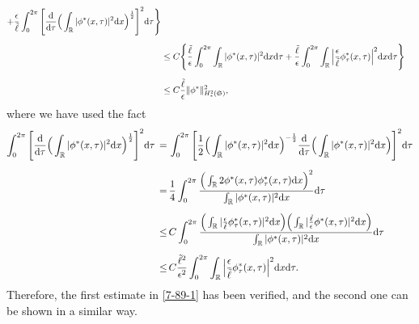 \documentclass[10pt, reqno]{amsart}
\numberwithin{equation}{section}
\theoremstyle{definition}
\newcommand{\R}{\mathbb R}
\def\R{{\mathfrak R}}
\def\R{\Bbb R}
\begin{document}
{\begin{appendix}
\begin{align*}
+ \frac{\epsilon}{\tilde\ell} \int_0^{2\pi} \Bigg[\frac{{\mathrm d}}{{\mathrm d} \tau}\Big(\int_{\R} |\phi^*(x, \tau)|^2  {\mathrm d} x \Big)^{\frac{1}{2}} \Bigg]^2{\mathrm d}\tau \Bigg\}
\nonumber\\[2mm]
 &\leq C \Bigg\{\frac{\tilde\ell}{\epsilon} \int_0^{2\pi} \int_{\R} |\phi^*(x, \tau)|^2  {\mathrm d} x {\mathrm d}\tau
+\frac{\tilde\ell}{\epsilon}\int_0^{2\pi}\int_{\R} \Big| \frac{\epsilon}{\tilde\ell}\phi^*_{\tau}(x, \tau)\Big|^2 {\mathrm d} x{\mathrm d}\tau \Bigg\}
\nonumber\\[2mm]
 &\le C\frac{\tilde \ell} {\epsilon} \|\phi^*\|_{H^2_*(\mathfrak S)}^2,
\end{align*}
where we have used the fact
\begin{align*}
 \int_0^{2\pi} \Bigg[\frac{{\mathrm d}}{{\mathrm d} \tau}\Big(\int_{\R} |\phi^*(x, \tau)|^2  {\mathrm d} x \Big)^{\frac{1}{2}} \Bigg]^2{\mathrm d}\tau
 \,=\,&\int_0^{2\pi} \Bigg[\frac{1}{2}\Big(\int_{\R} |\phi^*(x, \tau)|^2  {\mathrm d} x \Big)^{-\frac{1}{2}} \frac{{\mathrm d}}{{\mathrm d} \tau}\Big(\int_{\R} |\phi^*(x, \tau)|^2  {\mathrm d} x \Big) \Bigg]^2{\mathrm d}\tau
\nonumber\\[2mm]
  \,=\,&\frac{1}{4}\int_0^{2\pi}\frac{\Big(\int_{\R} 2\phi^*(x, \tau)\phi^*_{\tau}(x, \tau) {\mathrm d} x \Big)^2}{\int_{\R} |\phi^*(x, \tau)|^2  {\mathrm d} x }{\mathrm d}\tau
  \nonumber\\[2mm]
  \,\leq\,&C\int_0^{2\pi}\frac{\Big(\int_{\R} | \frac{\epsilon}{\tilde\ell}\phi^*_{\tau}(x, \tau)|^2 {\mathrm d} x \Big)\Big(\int_{\R} |\frac{\tilde\ell}{\epsilon}\phi^*(x, \tau)|^2 {\mathrm d} x \Big)}{\int_{\R} |\phi^*(x, \tau)|^2  {\mathrm d} x }{\mathrm d}\tau
    \nonumber\\[2mm]
  \,\leq\,&C \frac{\tilde\ell^2}{\epsilon^2}\int_0^{2\pi}\int_{\R} \Big| \frac{\epsilon}{\tilde\ell}\phi^*_{\tau}(x, \tau)\Big|^2 {\mathrm d} x{\mathrm d}\tau.
\end{align*}
Therefore, the first estimate in \eqref{7-89-1} has been verified, and the second one can be shown in a similar way.

\end{appendix}





}
\end{document}
